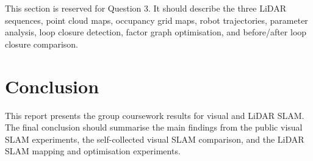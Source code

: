 \documentclass[conference]{IEEEtran}
\begin{document}

This section is reserved for Question 3. It should describe the three LiDAR sequences, point cloud maps, occupancy grid maps, robot trajectories, parameter analysis, loop closure detection, factor graph optimisation, and before/after loop closure comparison.

\section{Conclusion}
\label{sec:conclusion}


This report presents the group coursework results for visual and LiDAR SLAM. The final conclusion should summarise the main findings from the public visual SLAM experiments, the self-collected visual SLAM comparison, and the LiDAR SLAM mapping and optimisation experiments.
\end{document}
